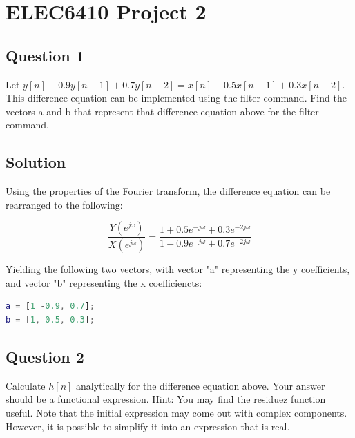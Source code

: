 \documentclass{article}
\begin{document}
  
\section*{ELEC6410 Project 2}

\subsection*{Question 1}

\begin{par}
Let $y[n] - 0.9y[n-1] + 0.7y[n-2] = x[n] + 0.5x[n-1] + 0.3x[n-2]$. This difference equation can be implemented using the filter command.  Find the vectors a and b that represent that difference equation above for the filter command.
\end{par} \vspace{1em}


\subsection*{Solution}

\begin{par}
Using the properties of the Fourier transform, the difference equation can be rearranged to the following:
\end{par} \vspace{1em}
\begin{par}
$$\frac{Y(e^{j\omega})}{X(e^{j\omega})} =
\frac{1 + 0.5e^{-j\omega} + 0.3e^{-2j\omega}}
{1 - 0.9e^{-j\omega} + 0.7e^{-2j\omega}}$$
\end{par} \vspace{1em}
\begin{par}
Yielding the following two vectors, with vector "a" representing the y coefficients, and vector "b" representing the x coefficiencts:
\end{par} \vspace{1em}
\begin{lstlisting}[language=matlab]
a = [1 -0.9, 0.7];
b = [1, 0.5, 0.3];
\end{lstlisting}

\subsection*{Question 2}

\begin{par}
Calculate $h[n]$ analytically for the difference equation above.  Your answer should be a functional expression.  Hint: You may find the residuez function useful.  Note that the initial expression may come out with complex components.  However, it is possible to simplify it into an expression that is real.
\end{par} \vspace{1em}
\end{document}
